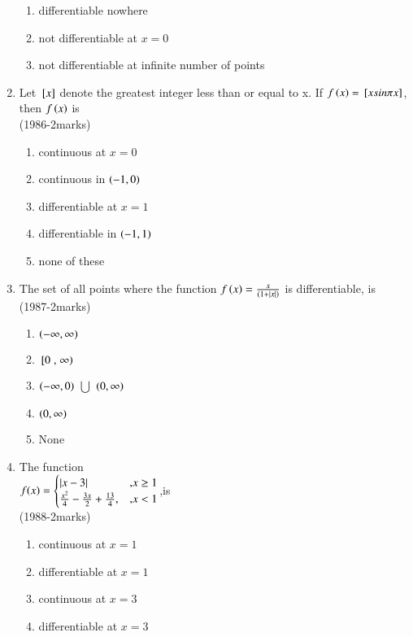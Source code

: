 \documentclass[journal,12pt,twocolumn]{IEEEtran}
\theoremstyle{remark}
\begin{document}
\begin{enumerate}
\begin{enumerate}
			\item differentiable nowhere 
			\item not differentiable at $x=0$
			\item not differentiable at infinite number of points \\
		\end{enumerate}
	\item Let ${}\left[x\right]$ denote the greatest integer less than or equal to x. If $f\left(x\right)={}\left[xsin \pi x\right]$, then $f\left(x\right)$ is \\ \hfill{(1986-2marks)}
		\begin{enumerate}
			\item continuous at $x=0$
			\item continuous in $\left(-1,0\right)$
			\item differentiable at $x=1$ 
			\item differentiable in $\left(-1,1\right)$ 
			\item none of these \\
		\end{enumerate}
	\item The set of all points where the function $f\left(x\right)=\frac{x}{(1+\left\vert x\right\vert)}$ is differentiable, is \\ \hfill{(1987-2marks)}
		\begin{enumerate}
			\item $\left(- \infty, \infty\right)$
			\item ${}\left[0\right., \left.\infty\right)$
			\item $\left(- \infty,0\right)$ $\bigcup$ $\left(0, \infty\right)$
			\item $\left(0, \infty\right)$
			\item None \\
		\end{enumerate}
	\item The function \\ $f(x)=\begin{cases}\left\vert x-3\right\vert & \text{,} x \geq 1 \\ \frac{x^2}{4}-\frac{3x}{2}+\frac{13}{4}, & \text{,} x<1 \end{cases}$,is \\ \hfill{(1988-2marks)}
			\begin{enumerate}
				\item continuous at $x=1$
				\item differentiable at $x=1$
				\item continuous at $x=3$
				\item differentiable at $x=3$ \\

\end{enumerate}
\end{enumerate}
\end{document}
